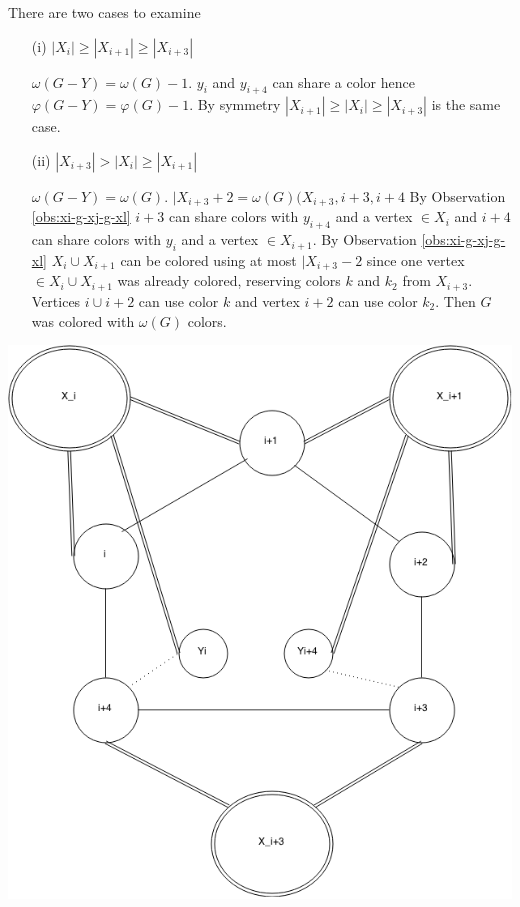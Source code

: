 \documentclass[12pt]{article}
\begin{document}
\begin{minipage}{0.5\textwidth}%
	 There are two cases to examine
	\begin{itemize}
	\item[(i)]
	$|X_{i}| \geq  |X_{i+1}| \geq |X_{i+3}|$

	$\omega(G - Y) = \omega(G) - 1$. $y_i$ and $y_{i+4}$ can share a color hence $\varphi(G - Y) = \varphi(G) - 1$. By symmetry $|X_{i+1}| \geq  |X_{i}| \geq |X_{i+3}|$ is the same case.

	\item[(ii)]
	$|X_{i+3}| > |X_{i}| \geq |X_{i+1}|$

	$\omega(G - Y) = \omega(G)$. $|X_{i+3} +2 =\omega(G) (X_{i+3}, i+3, i+4$ By Observation \ref{obs:xi-g-xj-g-xl} $i+3$ can share colors with $y_{i+4}$ and a vertex $\in X_i$ and $i+4$ can share colors with $y_i$ and a vertex $\in X_{i+1}$. By Observation \ref{obs:xi-g-xj-g-xl} $X_i \cup X_{i+1}$ can be colored using at most $|X_{i+3} - 2$ since one vertex $\in X_i \cup X_{i+1}$ was already colored, reserving colors $k$ and $k_2$ from $X_{i+3}$. Vertices $i \cup i+2$ can use color $k$ and vertex $i+2$ can use color $k_2$. Then $G$ was colored with $\omega(G)$ colors.
	\end{itemize}
\end{minipage}
\hfill
\begin{minipage}{0.5\textwidth}\raggedleft
	\includegraphics[width=\linewidth]{Yi-Yi4.png}
\end{minipage}
\end{document}

